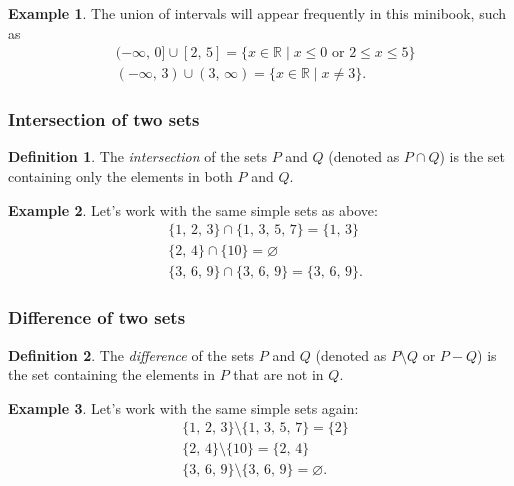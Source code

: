 \documentclass[
]{book}
\theoremstyle{definition}
\newtheorem{definition}{Definition}[chapter]
\theoremstyle{definition}
\newtheorem{example}{Example}[chapter]
\theoremstyle{definition}
\theoremstyle{definition}
\theoremstyle{remark}
\begin{document}
\begin{example}
\protect\hypertarget{exm:union-interval}{}\label{exm:union-interval}The union of intervals will appear frequently in this minibook, such as
\begin{align*}
& (-\infty,\, 0] \cup [2,\, 5] = \{x \in \mathbb{R} \mid x \le 0 \text{ or } 2 \le x \le 5\} \\
& (-\infty,\, 3) \cup (3,\, \infty)  = \{x \in \mathbb{R} \mid x \ne 3\} .
\end{align*}
\end{example}

\hypertarget{intersection-of-two-sets}{%
\subsubsection{Intersection of two sets}\label{intersection-of-two-sets}}

\begin{definition}
\protect\hypertarget{def:intersection}{}\label{def:intersection}The \emph{intersection} of the sets \(P\) and \(Q\) (denoted as \(P \cap Q\)) is the set containing only the elements in both \(P\) and \(Q\).
\end{definition}

\begin{example}
\protect\hypertarget{exm:intersection}{}\label{exm:intersection}Let's work with the same simple sets as above:
\begin{align*}
& \{1,\, 2,\, 3\} \cap \{1,\, 3,\, 5,\, 7\} = \{1,\, 3\} \\
& \{2,\, 4\} \cap \{10\} = \varnothing \\
& \{3,\, 6,\, 9\} \cap \{3,\, 6,\, 9\} = \{3,\, 6,\, 9\} .
\end{align*}
\end{example}

\hypertarget{difference-of-two-sets}{%
\subsubsection{Difference of two sets}\label{difference-of-two-sets}}

\begin{definition}
\protect\hypertarget{def:set-diff}{}\label{def:set-diff}The \emph{difference} of the sets \(P\) and \(Q\) (denoted as \(P \setminus Q\) or \(P - Q\)) is the set containing the elements in \(P\) that are not in \(Q\).
\end{definition}

\begin{example}
\protect\hypertarget{exm:set-diff}{}\label{exm:set-diff}Let's work with the same simple sets again:
\begin{align*}
& \{1,\, 2,\, 3\} \setminus \{1,\, 3,\, 5,\, 7\} = \{2\} \\
& \{2,\, 4\} \setminus \{10\} = \{2,\, 4\} \\
& \{3,\, 6,\, 9\} \setminus \{3,\, 6,\, 9\} = \varnothing .
\end{align*}
\end{example}
\end{document}
